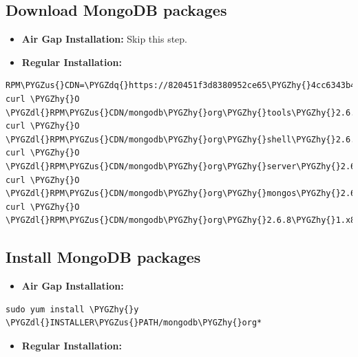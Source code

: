\documentclass[letterpaper,10pt,openany,oneside]{sphinxmanual}
\def\PYGZus{\char`\_}
\def\PYGZdl{\char`\$}
\def\PYGZhy{\char`\-}
\def\PYGZdq{\char`\"}
\begin{document}
\subsection{Download MongoDB packages}
\label{AnacondaRepository:download-mongodb-packages}\begin{itemize}
\item {} 
\textbf{Air Gap Installation:} Skip this step.

\item {} 
\textbf{Regular Installation:}

\end{itemize}

\begin{Verbatim}[commandchars=\\\{\}]
RPM\PYGZus{}CDN=\PYGZdq{}https://820451f3d8380952ce65\PYGZhy{}4cc6343b423784e82fd202bb87cf87cf.ssl.cf1.rackcdn.com\PYGZdq{}
curl \PYGZhy{}O \PYGZdl{}RPM\PYGZus{}CDN/mongodb\PYGZhy{}org\PYGZhy{}tools\PYGZhy{}2.6.8\PYGZhy{}1.x86\PYGZus{}64.rpm
curl \PYGZhy{}O \PYGZdl{}RPM\PYGZus{}CDN/mongodb\PYGZhy{}org\PYGZhy{}shell\PYGZhy{}2.6.8\PYGZhy{}1.x86\PYGZus{}64.rpm
curl \PYGZhy{}O \PYGZdl{}RPM\PYGZus{}CDN/mongodb\PYGZhy{}org\PYGZhy{}server\PYGZhy{}2.6.8\PYGZhy{}1.x86\PYGZus{}64.rpm
curl \PYGZhy{}O \PYGZdl{}RPM\PYGZus{}CDN/mongodb\PYGZhy{}org\PYGZhy{}mongos\PYGZhy{}2.6.8\PYGZhy{}1.x86\PYGZus{}64.rpm
curl \PYGZhy{}O \PYGZdl{}RPM\PYGZus{}CDN/mongodb\PYGZhy{}org\PYGZhy{}2.6.8\PYGZhy{}1.x86\PYGZus{}64.rpm
\end{Verbatim}


\subsection{Install MongoDB packages}
\label{AnacondaRepository:install-mongodb-packages}\begin{itemize}
\item {} 
\textbf{Air Gap Installation:}

\end{itemize}

\begin{Verbatim}[commandchars=\\\{\}]
sudo yum install \PYGZhy{}y \PYGZdl{}INSTALLER\PYGZus{}PATH/mongodb\PYGZhy{}org*
\end{Verbatim}
\begin{itemize}
\item {} 
\textbf{Regular Installation:}

\end{itemize}
\end{document}
